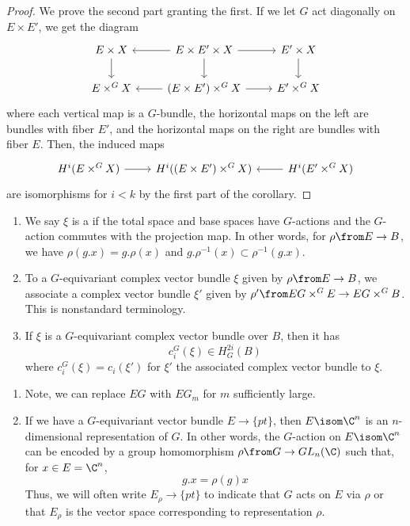 \documentclass[11pt,leqno,oneside]{amsbook}
\numberwithin{thm}{section}
\begin{document}
\begin{proof}
  We prove the second part granting the first. If we let \(G\) act
  diagonally on \(E \times E'\), we get the diagram \[
    \begin{tikzcd}
      E \times X \ar[d] & \ar[l] E \times E' \times X \ar[d] \ar[r] & E' \times X \ar[d]\\
      E \times^G X & \ar[l] (E \times E') \times^G X \ar[r] & E' \times^G X
    \end{tikzcd}
  \]
  where each vertical map is a \(G\)-bundle, the horizontal maps on
  the left are bundles with fiber \(E'\), and the horizontal maps on
  the right are bundles with fiber \(E\). Then, the induced maps \[
    \begin{tikzcd}
      H^i(E \times^G X) \ar[r] & H^i((E \times E') \times^G X) &
      \ar[l] H^i(E' \times^G X)
    \end{tikzcd}
  \]
  are isomorphisms for \(i < k\) by the first part of the corollary. 
\end{proof}
\begin{defn}
  \begin{enumerate}
  \item We say \(\xi\) is a  if
    the total space and base spaces have \(G\)-actions and the
    \(G\)-action commutes with the projection map. In other words, for
    \(\rho \from E \to B\), we have \(\rho(g.x) = g.\rho(x)\) and
    \(g.\rho^{-1}(x) \subset \rho^{-1}(g.x)\).
  \item To a \(G\)-equivariant complex vector bundle \(\xi\) given by
    \(\rho \from E \to B\), we associate a
    complex vector bundle \(\xi'\) given by \(\rho' \from EG \times^G
    E \to EG \times^G B\). This is nonstandard terminology. 
  \item If \(\xi\) is a \(G\)-equivariant complex vector bundle over
    \(B\), then it has  \[
      c_i^G(\xi) \in H_G^{2i}(B)
    \]
    where \(c_i^G(\xi) = c_i(\xi')\) for \(\xi'\) the associated
    complex vector bundle to \(\xi\).
  \end{enumerate}
\end{defn}
\begin{rmk}
  \begin{enumerate}
  \item Note, we can replace \(EG\) with \(EG_m\) for \(m\)
    sufficiently large.
  \item If we have a \(G\)-equivariant vector bundle \(E \to \{pt\}\),
    then \(E \isom \C^n\) is an \(n\)-dimensional representation of
    \(G\). In other words, the \(G\)-action on \(E \isom \C^n\) can be
    encoded by a group homomorphism \(\rho \from G \to GL_n(\C)\) such
    that, for \(x \in E = \C^n\), \[
      g.x = \rho(g)x
    \]
    Thus, we will often write \(E_\rho \to \{pt\}\) to indicate that
    \(G\) acts on \(E\) via \(\rho\) or that \(E_\rho\) is the vector
    space corresponding to representation \(\rho\).
  \end{enumerate}
\end{rmk}
\end{document}

